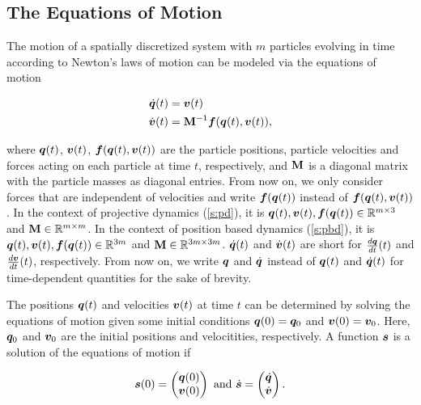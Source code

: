 \subsection{The Equations of Motion}\label{s:equations-of-motion}

The motion of a spatially discretized system with $m$ particles evolving in time according to Newton's laws of motion can be modeled via 
the equations of motion

\begin{align}
    \begin{split}\label{eq:equations-of-motion}
        \dot{\bm{q}}(t) &= \bm{v}(t) \\
        \dot{\bm{v}}(t) &= \mathbf{M}^{-1}\bm{f}(\bm{q}(t), \bm{v}(t)),
    \end{split}
\end{align}

\noindent where $\bm{q}(t)$, $\bm{v}(t)$, $\bm{f}(\bm{q}(t), \bm{v}(t))$ are the particle positions, particle velocities and 
forces acting on each particle at time $t$, respectively, and $\mathbf{M}$ is a diagonal matrix with the particle masses as diagonal entries. 
From now on, we only consider forces that are independent of velocities and write $\bm{f}(\bm{q}(t))$ instead of 
$\bm{f}(\bm{q}(t), \bm{v}(t))$. In the context of projective dynamics (\cref{s:pd}), it is
$\bm{q}(t), \bm{v}(t), \bm{f}(\bm{q}(t)) \in \mathbb{R}^{m \times 3}$ and $\mathbf{M} \in \mathbb{R}^{m \times m}$. 
In the context of position based dynamics (\cref{s:pbd}), it is $\bm{q}(t), \bm{v}(t), \bm{f}(\bm{q}(t)) \in \mathbb{R}^{3m}$ and $\mathbf{M} 
\in \mathbb{R}^{3m \times 3m}$. $\dot{\bm{q}}(t)$ and $\dot{\bm{v}}(t)$ are short for $\frac{d\bm{q}}{dt}(t)$ and
$\frac{d\bm{v}}{dt}(t)$, respectively. From now on, we write $\bm{q}$ and $\dot{\bm{q}}$ instead of $\bm{q}(t)$ and $\dot{\bm{q}}(t)$ for 
time-dependent quantities for the sake of brevity.

The positions $\bm{q}(t)$ and velocities $\bm{v}(t)$ at time $t$ can be determined by solving the equations of motion given some initial conditions
$\bm{q}(0) = \bm{q}_0$ and $\bm{v}(0) = \bm{v}_0$. Here, $\bm{q}_0$ and $\bm{v}_0$ are the initial positions and velocitities, respectively. 
A function $\bm{s}$ is a solution of the equations of motion if 

\[
    \bm{s}(0) = 
    \begin{pmatrix}
        \bm{q}(0)\\
        \bm{v}(0)
    \end{pmatrix} 
    \text{ and } 
    \dot{\bm{s}} = 
    \begin{pmatrix}
        \dot{\bm{q}}\\
        \dot{\bm{v}}
    \end{pmatrix}.
\]

